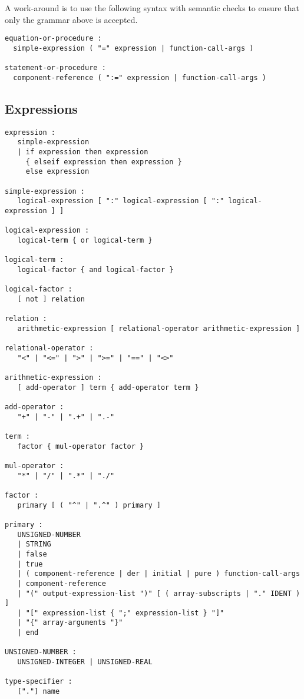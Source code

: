 A work-around is to use the following syntax with semantic checks to ensure that only the grammar above is accepted.
\begin{lstlisting}[language=grammar]
equation-or-procedure :
  simple-expression ( "=" expression | function-call-args )

statement-or-procedure :
  component-reference ( ":=" expression | function-call-args )
\end{lstlisting}

\subsection{Expressions}\label{expressions1}

\begin{lstlisting}[language=grammar]
expression :
   simple-expression
   | if expression then expression
     { elseif expression then expression }
     else expression

simple-expression :
   logical-expression [ ":" logical-expression [ ":" logical-expression ] ]

logical-expression :
   logical-term { or logical-term }

logical-term :
   logical-factor { and logical-factor }

logical-factor :
   [ not ] relation

relation :
   arithmetic-expression [ relational-operator arithmetic-expression ]

relational-operator :
   "<" | "<=" | ">" | ">=" | "==" | "<>"

arithmetic-expression :
   [ add-operator ] term { add-operator term }

add-operator :
   "+" | "-" | ".+" | ".-"

term :
   factor { mul-operator factor }

mul-operator :
   "*" | "/" | ".*" | "./"

factor :
   primary [ ( "^" | ".^" ) primary ]

primary :
   UNSIGNED-NUMBER
   | STRING
   | false
   | true
   | ( component-reference | der | initial | pure ) function-call-args
   | component-reference
   | "(" output-expression-list ")" [ ( array-subscripts | "." IDENT ) ]
   | "[" expression-list { ";" expression-list } "]"
   | "{" array-arguments "}"
   | end

UNSIGNED-NUMBER :
   UNSIGNED-INTEGER | UNSIGNED-REAL

type-specifier :
   ["."] name


\end{lstlisting}
